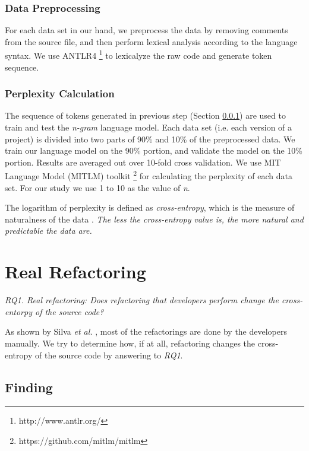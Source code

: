 \documentclass[conference]{IEEEtran}
\begin{document}
\subsubsection{Data Preprocessing} \label{Preprocessing}
For each data set in our hand, we preprocess the data by removing comments from the source file, and then perform lexical analysis according to the language syntax. We use ANTLR4 \footnote{http://www.antlr.org/} to lexicalyze the raw code and generate token sequence.

\subsubsection{Perplexity Calculation}
The sequence of tokens generated in previous step (Section \ref{Preprocessing}) are used to train and test the \textit{n-gram} language model. Each data set (i.e. each version of a project) is divided into two parts of 90\% and 10\% of the preprocessed data. We train our language model on the 90\% portion, and validate the model on the 10\% portion. Results are averaged out over 10-fold cross validation. We use MIT Language Model (MITLM) toolkit \footnote{https://github.com/mitlm/mitlm} for calculating the perplexity of each data set. For our study we use 1 to 10 as the value of \textit{n}.

The logarithm of perplexity is defined as \textit{cross-entropy}, which is the measure of naturalness of the data \cite{Hindle}. \textit{The less the cross-entropy value is, the more natural and predictable the data are.}


\section{Real Refactoring} \label{ReallRefactoring}
\textit{RQ1. Real refactoring: Does refactoring that developers perform change the cross-entorpy of the source code?}


As shown by Silva \textit{et al.} \cite{Silva}, most of the refactorings are done by the developers manually. We try to determine how, if at all, refactoring changes the cross-entropy of the source code by answering to \textit{RQ1}. 

\subsection{Finding}
\end{document}
